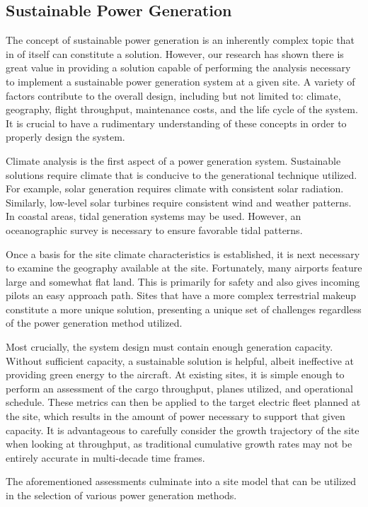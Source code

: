 \documentclass[../main.tex]{subfiles}
\begin{document}
\subsection{Sustainable Power Generation} %
The concept of sustainable power generation is an inherently complex topic that in of itself can constitute a solution. However, our research has shown there is great value in providing a solution capable of performing the analysis necessary to implement a sustainable power generation system at a given site. A variety of factors contribute to the overall design, including but not limited to: climate, geography, flight throughput, maintenance costs, and the life cycle of the system. It is crucial to have a rudimentary understanding of these concepts in order to properly design the system.\par
Climate analysis is the first aspect of a power generation system. Sustainable solutions require climate that is conducive to the generational technique utilized. For example, solar generation requires climate with consistent solar radiation. Similarly, low-level solar turbines require consistent wind and weather patterns. In coastal areas, tidal generation systems may be used. However, an oceanographic survey is necessary to ensure favorable tidal patterns.\par
Once a basis for the site climate characteristics is established, it is next necessary to examine the geography available at the site. Fortunately, many airports feature large and somewhat flat land. This is primarily for safety and also gives incoming pilots an easy approach path. Sites that have a more complex terrestrial makeup constitute a more unique solution, presenting a unique set of challenges regardless of the power generation method utilized.\par
Most crucially, the system design must contain enough generation capacity. Without sufficient capacity, a sustainable solution is helpful, albeit ineffective at providing green energy to the aircraft. At existing sites, it is simple enough to perform an assessment of the cargo throughput, planes utilized, and operational schedule. These metrics can then be applied to the target electric fleet planned at the site, which results in the amount of power necessary to support that given capacity. It is advantageous to carefully consider the growth trajectory of the site when looking at throughput, as traditional cumulative growth rates may not be entirely accurate in multi-decade time frames.\par
The aforementioned assessments culminate into a site model that can be utilized in the selection of various power generation methods.
\end{document}
